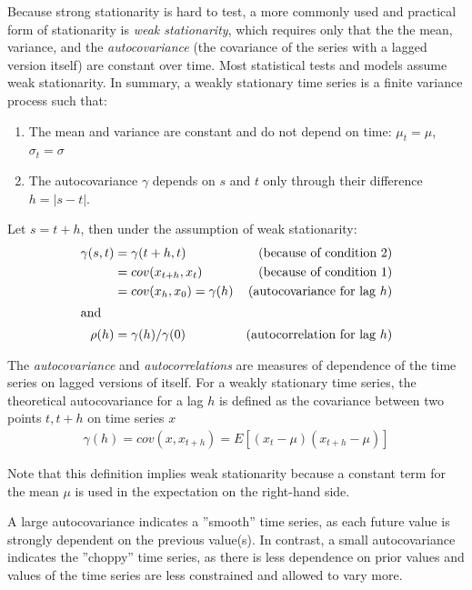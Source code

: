 Because strong stationarity is hard to test, a more commonly used and practical form of stationarity is \emph{weak stationarity}, which requires only that the the mean, variance, and the \emph{autocovariance} (the covariance of the series with a lagged version itself) are constant over time. Most statistical tests and models assume weak stationarity. In summary, a weakly stationary time series is a finite variance process such that:

\begin{enumerate}
\item The mean and variance are constant and do not depend on time: $\mu_t = \mu$, $\sigma_t = \sigma$
\item The autocovariance $\gamma$ depends on $s$ and $t$ only through their difference $h=|s-t|$.
\end{enumerate}

Let $s = t + h$, then under the assumption of weak stationarity:
\begin{align*}
\gamma(s, t) &= \gamma(t+h, t)  &\text{(because of condition 2)} \\ 
             &= cov(x_{t+h}, x_t)  &\text{(because of condition 1)} \\ 
             &= cov(x_h, x_0) = \gamma(h)  &\text{(autocovariance for lag $h$)} \\
\intertext{and}
\rho(h) &= \gamma(h) / \gamma(0) &\text{(autocorrelation for lag $h$)}
\end{align*}

The \emph{autocovariance} and \emph{autocorrelations} are measures of dependence of the time series on lagged versions of itself. For a weakly stationary time series, the theoretical autocovariance for a lag $h$ is defined as the covariance between two points $t, t+h$ on time series $x$
\begin{align*}
\gamma(h) = cov(x, x_{t+h}) = E [ (x_t - \mu)(x_{t+h} - \mu)] 
\end{align*}

Note that this definition implies weak stationarity because a constant term for the mean $\mu$ is used in the expectation on the right-hand side.

A large autocovariance indicates a ''smooth'' time series, as each future value is strongly dependent on the previous value(s). In contrast, a small autocovariance indicates the ''choppy'' time series, as there is less dependence on prior values and values of the time series are less constrained and allowed to vary more. 

